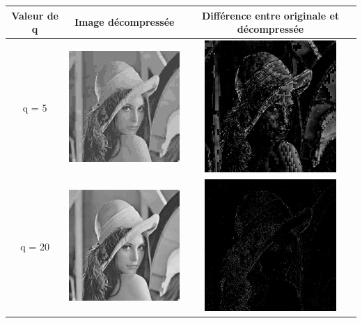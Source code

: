 \documentclass[a4paper,11pt]{article}
\begin{document}
  \begin{tabular}{|c|c|c|}
   \hline
   Valeur de q & Image décompressée & Différence entre originale et décompressée \\
   \hline
   q = 5  & \includegraphics[width=5cm]{lena_q5.png} & \includegraphics[width=5cm]{lena_q5_diff.png} \\
   \hline
   q = 20 & \includegraphics[width=5cm]{lena_q20.png} & \includegraphics[width=5cm]{lena_q20_diff.png} \\
   \hline

\end{tabular}
\end{document}
